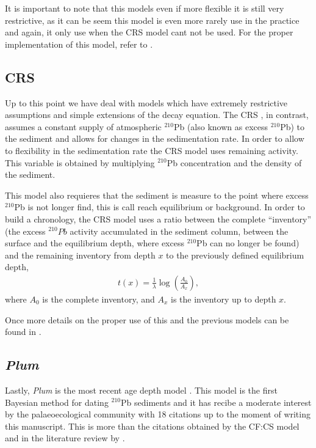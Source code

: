 \documentclass [10pt] {article}
\begin{document}
It is important to note that this models even if more flexible it is still very restrictive, as it can be seem this model is even more rarely use in the practice and again, it only use when the CRS model cant not be used. 
For the proper implementation of this model, refer to \citet{Sanchez-Cabeza2012}.


\subsection{CRS}

Up to this point we have deal with models which have extremely restrictive assumptions and simple extensions of the decay equation. 
The CRS \citep{Appleby1998,Appleby2001,Appleby2008}, in contrast, assumes a constant supply of atmospheric $^{210}$Pb (also known as excess $^{210}$Pb) to the sediment and allows for changes in the sedimentation rate. In order to allow to flexibility in the sedimentation rate the CRS model uses remaining activity.
This variable is obtained by multiplying $^{210}$Pb concentration and the density of the sediment.  

This model also requieres that the sediment is measure to the point where excess $^{210}$Pb is not longer find, this is call reach equilibrium or background.
In order to build a chronology, the CRS model uses a ratio between the complete ``inventory'' (the excess $^{210}Pb$ activity accumulated in the sediment column, between the surface and the equilibrium depth, where excess $^{210}$Pb  can no longer be found) and the remaining  inventory from depth $x$ to the previously defined equilibrium depth, 
\begin{eqnarray}
	t(x)=\frac{1}{\lambda}\log\left( \frac{A_0}{A_x}\right),
\end{eqnarray}
where $A_0$ is the complete inventory, and $A_x$ is the inventory up to depth $x$.


Once more details on the proper use of this and the previous models can be found in \citet{Sanchez-Cabeza2012}.

\subsection{\textit{Plum}}

Lastly, \textit{Plum} is the most recent age depth model \citep{Aquino2018}.
This model is the first Bayesian method for dating $^{210}$Pb sediments and it has recibe a moderate interest by the palaeoecological community with 18 citations up to the moment of writing this manuscript.
This is more than the citations obtained by the CF:CS model and  in the literature review by \citet{Courtney2019}.
\end{document}

